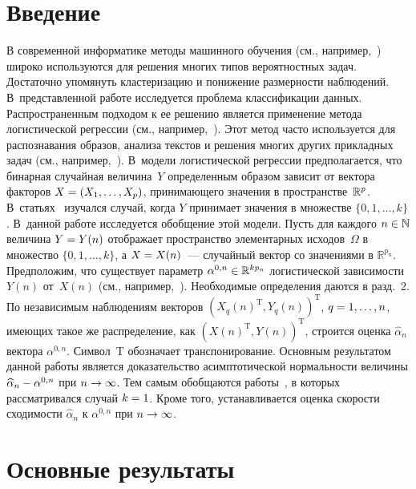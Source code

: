       \begin{multicols}{2}

            \label{st\stat}


\section{Введение}



В современной информатике методы машинного обучения (см., например,~\cite{ML}) широко 
используются для решения многих типов вероятностных задач. Достаточно упомянуть 
кластеризацию и понижение размерности наблюдений. В~представленной работе исследуется 
проб\-ле\-ма классификации данных. Распространенным подходом к ее решению является 
применение метода логистической регрессии (см., например,~\cite{Francis,LONG}). Этот 
метод час\-то используется для распознавания образов, анализа текстов и решения многих 
других прикладных задач (см., например,~\cite{text, tensor}). В~модели логистической 
регрессии предполагается, что бинарная случайная величина~$Y$ определенным образом 
зависит от вектора факторов $X\hm=(X_1,\ldots,X_p)$, принимающего значения в пространстве~$\mathbb R^p$. 
В~статьях~\cite{Anderson,hossain} изучался случай, когда $Y$ принимает значения в 
множестве $\{0,1,\ldots,k\}$. В~данной работе исследуется обобщение этой модели. Пусть 
для каждого $n\hm\in\mathbb{N}$ величина $Y\hm=Y(n)$ отображает пространство элементарных 
исходов~$\Omega$ в множество $\{0,1,\ldots,k\}$, а $X\hm=X(n)$~--- случайный вектор со 
значениями в $\mathbb{R}^{p_n}$. Предположим, что существует параметр $\alpha^{0,n}\hm\in\R^{kp_n}$ 
логистической зависимости~$Y(n)$ от~$X(n)$ (см., например,~\cite{gee}). Необходимые 
определения даются в разд.~2. По независимым наблюдениям векторов 
$(X_q(n)^{\mathrm{T}},Y_q(n))^{\mathrm{T}}$, $q\hm=1,\ldots,n$, имеющих такое же 
распределение, как $(X(n)^{\mathrm{T}},Y(n))^{\mathrm{T}}$, 
строится оценка $\widehat{\alpha}_n$ вектора $\alpha^{0,n}$. Символ~T обозначает 
транспонирование. Основным результатом данной работы является доказательство асимптотической 
нормальности величины $\widehat{\alpha}_n\hm-\alpha^{0,n}$ при 
$n\hm\rightarrow\infty$. Тем самым обобщаются работы~\cite{gee, MLELR}, 
в которых рас\-смат\-ри\-вал\-ся случай $k\hm=1$. Кроме того, устанавливается оценка скорости 
сходимости $\widehat{\alpha}_n$ к $\alpha^{0,n}$ при $n\hm\rightarrow\infty$.


\section{Основные результаты}



\end{multicols}

